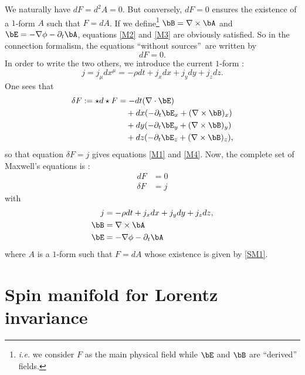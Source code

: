 We naturally have $dF=d^2A=0$. But conversely, $dF=0$ ensures the existence of a $1$-form $A$ such that $F=dA$. If we define\footnote{\emph{i.e.} we consider $F$ as the main physical field while $\bE$ and $\bB$ are ``derived'' fields.} $\bB=\nabla\times\bA$ and $\bE=-\nabla\phi-\partial_t\bA$, equations \eqref{M2} and \eqref{M3} are obviously satisfied. So in the connection formalism, the equations ``without sources''\ are written by
\begin{equation}\label{M23}
 dF=0.
\end{equation}
In order to write the two others, we introduce the current $1$-form :
\[
  j=j_{\mu}dx^{\mu}=-\rho dt+j_x dx+j_y dy+j_z dz.
\]
%
One sees that
\begin{equation}
\begin{split}
  \delta F:=\star d\star F&=-dt(\nabla\cdot\bE)\\
                &\quad+ dx(-\partial_t \bE_x+ (\nabla\times\bB)_x )\\
		&\quad+ dy(-\partial_t \bE_y+ (\nabla\times\bB)_y )\\
		&\quad+ dz(-\partial_t \bE_z+ (\nabla\times\bB)_z ),
\end{split}
\end{equation}
so that equation $\delta F=j$ gives equations \eqref{M1} and \eqref{M4}. Now, the complete set of Maxwell's equations is :
\begin{subequations}
\begin{align}
   d F&= 0\label{SM1}\\
   \delta F &=j\label{SM2}
\end{align}
\end{subequations}
with
\begin{subequations}
\begin{align}
j&=-\rho dt+j_x dx+j_y dy+j_z dz,\\
  \bB&=\nabla\times\bA\\
  \bE&=-\nabla\phi-\partial_t\bA
\end{align}
\end{subequations}
where $A$ is a $1$-form such that $F=dA$ whose existence is given by \eqref{SM1}.

\section{Spin manifold for Lorentz invariance}
\label{subsec:incl_Lorentz}

